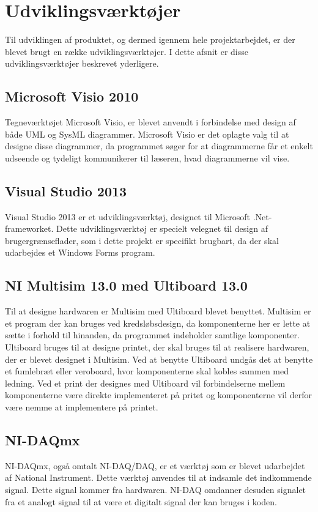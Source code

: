 \section{Udviklingsværktøjer}
Til udviklingen af produktet, og dermed igennem hele projektarbejdet, er der blevet brugt en række udviklingsværktøjer. I dette afsnit er disse udviklingsværktøjer beskrevet yderligere.
\subsection{Microsoft Visio 2010}
Tegneværktøjet Microsoft Visio, er blevet anvendt i forbindelse med design af både UML og SysML diagrammer. Microsoft Visio er det oplagte valg til at designe disse diagrammer, da programmet søger for at diagrammerne får et enkelt udseende og tydeligt kommunikerer til læseren, hvad diagrammerne vil vise.
\subsection{Visual Studio 2013}
Visual Studio 2013 er et udviklingsværktøj, designet til Microsoft .Net-frameworket. Dette udviklingsværktøj er specielt velegnet til design af brugergrænseflader, som i dette projekt er specifikt brugbart, da der skal udarbejdes et Windows Forms program.
\subsection{NI Multisim 13.0 med Ultiboard 13.0}
Til at designe hardwaren er Multisim med Ultiboard blevet benyttet. Multisim er et program der kan bruges ved kredsløbsdesign, da komponenterne her er lette at sætte i forhold til hinanden, da programmet indeholder samtlige komponenter. Ultiboard bruges til at designe printet, der skal bruges til at realisere hardwaren, der er blevet designet i Multisim. Ved at benytte Ultiboard undgås det at benytte et fumlebræt eller veroboard, hvor komponenterne skal kobles sammen med ledning. Ved et print der designes med Ultiboard vil forbindelserne mellem komponenterne være direkte implementeret på pritet og komponenterne vil derfor være nemme at implementere på printet.
\subsection{NI-DAQmx}
NI-DAQmx, også omtalt NI-DAQ/DAQ, er et værktøj som er blevet udarbejdet af National Instrument. Dette værktøj anvendes til at indsamle det indkommende signal. Dette signal kommer fra hardwaren. NI-DAQ omdanner desuden signalet fra et analogt signal til at være et digitalt signal der kan bruges i koden. 
